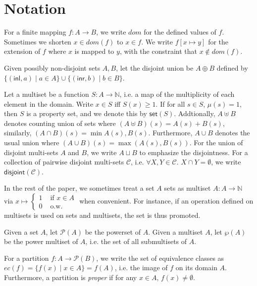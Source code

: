 \documentclass{easychair}
\newcommand{\ms}[1]{\ensuremath{\mathsf{#1}}}
\newcommand{\dist}[1]{\mathsf{disjoint}(#1)}
\theoremstyle{definition}
\begin{document}
\newpage
\label{sect:bib}

%
%
%


\appendix\label{sect:appendix}

\section{Notation}
\label{sect:notation}
For a finite mapping $f : A \to B$, we write $dom$ for the defined values of $f$. Sometimes we shorten $x \in dom(f)$ to $x \in f$. We write $f[x \mapsto y]$ for the extension of $f$ where $x$ is mapped to $y$, with the constraint that $x \notin dom(f)$. 

Given possibly non-disjoint sets $A,B$, let the disjoint union be $A \oplus B$ defined by 
$\{(\ms{inl},a) \mid a \in A\} \cup \{(\ms{inr},b) \mid b \in B\}$.

Let a multiset be a function $S : A \to \mathbb{N}$, i.e. a map of the multiplicity of each element in the domain.  Write $x \in S$ iff $S(x) \ge 1$. If for all  $s \in S$, $\mu(s) = 1$, then $S$ 
is a property set, and we denote this by $\ms{set}(S)$. Addtionally, $A \uplus B$ denotes 
counting union of sets where $(A \uplus B) (s) = A (s) + B(s)$, similarly, 
$(A \cap B)(s) = \min{A(s),B(s)}$. Furthermore, $A \cup B$ denotes the usual union where 
$(A \cup B)(s) = \max{(A(s),B(s))}$.  For the union of disjoint multi-sets $A$ and $B$, 
we write $A \sqcup B$ to emphasize the disjointness.  For a collection of pairwise disjoint 
multi-sets $\mathcal{C}$, i.e. $\forall X,Y \in \mathcal{C}$. $X \cap Y = \emptyset$, we write $\dist{\mathcal{C}}$.

In the rest of the paper, 
we sometimes treat a set $A$ sets as multiset $A : A \to \mathbb{N}$ via 
$x \mapsto \begin{cases} 1 &\text{ if } x \in A \\0 &\text{ o.w.}\end{cases}$ when convenient. 
For instance, if an operation defined on multisets is used on sets and multisets, the set 
is thus promoted.

Given a set $A$, let $\mathcal{P}(A)$ be the powerset of $A$. Given a multiset $A$, let 
$\wp(A)$ be the power multiset of $A$, i.e. the set of all submultisets of $A$.

For a partition $f : A \to \mathcal{P}(B)$, we write the set of equivalence classes
as $ec(f) = \{f(x) \mid x \in A\} = f(A)$, i.e. the image of $f$ on its domain $A$.
Furthermore, a partition is \emph{proper} if for any $x \in A$, $f(x) \neq \emptyset$.
\end{document}
